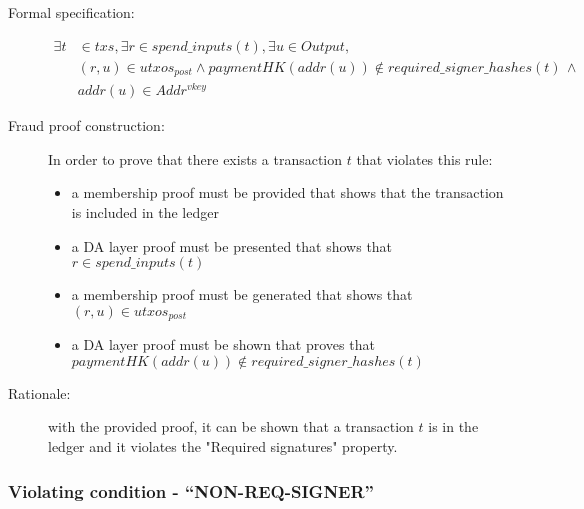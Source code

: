 \documentclass[../midgard.tex]{subfiles}
\begin{document}
\begin{description}

\item[Formal specification:]
\begin{equation*}
\begin{split}
    \exists t & \in txs, \exists r \in spend\_inputs(t), \exists u \in Output, \\
    & (r, u) \in utxos_{post} \land paymentHK(addr(u)) \notin required\_signer\_hashes(t) \, \land \\
    & addr(u) \in Addr^{vkey}
\end{split}
\end{equation*}

\item[Fraud proof construction:] In order to prove that there exists a transaction $t$ that violates this rule:
\begin{itemize}
    \item a membership proof must be provided that shows that the transaction is included in the ledger
    \item a DA layer proof must be presented that shows that $r \in spend\_inputs(t)$
    \item a membership proof must be generated that shows that $(r, u) \in utxos_{post}$
    \item a DA layer proof must be shown that proves that \\ $paymentHK(addr(u)) \notin required\_signer\_hashes(t)$
\end{itemize}

\item[Rationale:] with the provided proof, it can be shown that a transaction $t$ is in the ledger and it violates the "Required signatures" property.

\end{description}

\subsubsection{Violating condition - ``NON-REQ-SIGNER''}
\label{sec:NON-REQ-SIGNER}
\end{document}
